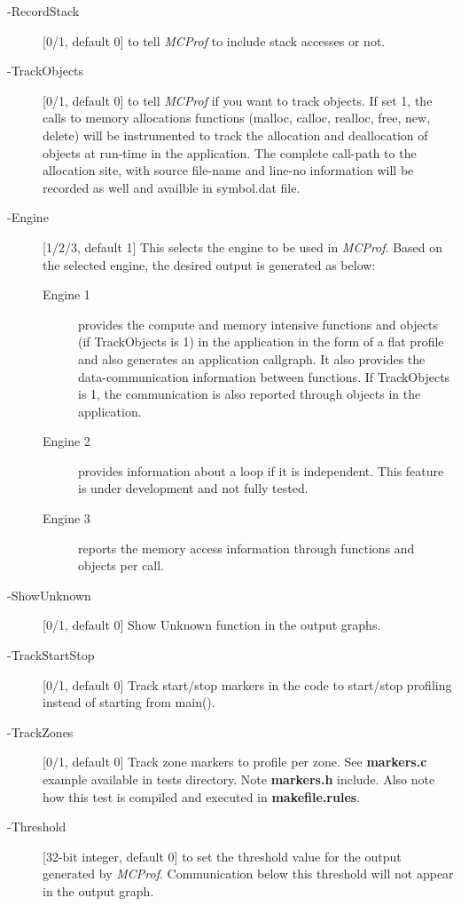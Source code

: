 \documentclass[10pt]{article}
\newcommand{\MCPROF}{\emph{MCProf}}
\begin{document}
\begin{description}

\item [-RecordStack] [0/1, default 0] to tell \MCPROF{} to include stack accesses or not.

\item [-TrackObjects] [0/1, default 0] to tell \MCPROF{} if you want to track 
objects. If set 1, the calls to memory allocations functions (malloc, calloc, 
realloc, free, new, delete) will be instrumented to track the allocation and 
deallocation of objects at run-time in the application. The complete call-path 
to the allocation site, with source file-name and line-no information will be 
recorded as well and availble in symbol.dat file.

\item [-Engine] [1/2/3, default 1] This selects the engine to be used in
    \MCPROF{}.  Based on the selected engine, the desired output is generated as
    below:

    \begin{description}

    \item [Engine 1]    provides the compute and memory intensive functions and
        objects (if TrackObjects is 1) in the application in the form of a flat
        profile and also generates an application callgraph. It also provides the
        data-communication information between functions. If TrackObjects is 1,
        the communication is also reported through objects in the application.

    \item [Engine 2]    provides information about a loop if it is independent.
        This feature is under development and not fully tested.

    \item [Engine 3]    reports the memory access information through functions
        and objects per call.

    \end{description}

\item [-ShowUnknown]  [0/1, default 0] Show Unknown function in the output graphs.

\item [-TrackStartStop] [0/1, default 0] Track start/stop markers in the code to
    start/stop profiling instead of starting from main().

\item [-TrackZones] [0/1, default 0] Track zone markers to profile per zone. See
    \textbf{markers.c} example available in tests directory. Note \textbf{markers.h}
    include. Also note how this test is compiled and executed in \textbf{makefile.rules}.

\item [-Threshold] [32-bit integer, default 0] to set the threshold value for the 
    output generated by \MCPROF{}. Communication below this threshold will not appear
    in the output graph.

\end{description}
\end{document}
